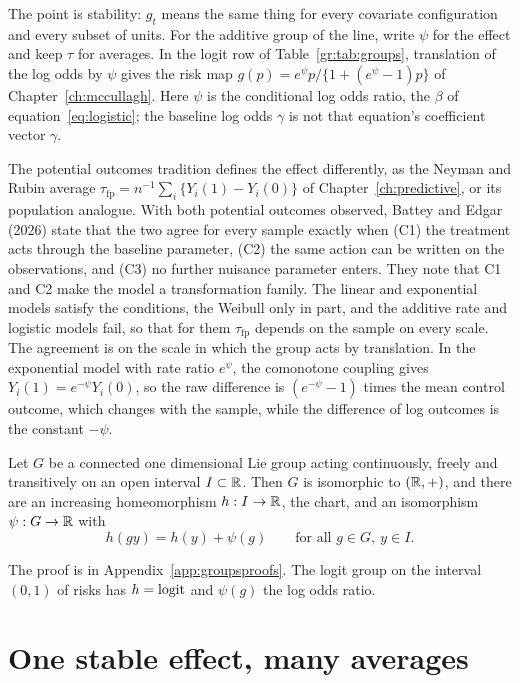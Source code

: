 The point is stability: $g_t$ means the same thing for every covariate configuration and every subset of units. For the additive group of the line, write $\psi$ for the effect and keep $\tau$ for averages. In the logit row of Table~\ref{gr:tab:groups}, translation of the log odds by $\psi$ gives the risk map $g(p)=e^{\psi}p/\{1+(e^{\psi}-1)p\}$ of Chapter~\ref{ch:mccullagh}. Here $\psi$ is the conditional log odds ratio, the $\beta$ of equation~\eqref{eq:logistic}; the baseline log odds $\gamma$ is not that equation's coefficient vector $\gamma$.

The potential outcomes tradition defines the effect differently, as the Neyman and Rubin average $\tau_{\mathrm{fp}}=n^{-1}\sum_i\{Y_i(1)-Y_i(0)\}$ of Chapter~\ref{ch:predictive}, or its population analogue. With both potential outcomes observed, Battey and Edgar (2026) state that the two agree for every sample exactly when (C1) the treatment acts through the baseline parameter, (C2) the same action can be written on the observations, and (C3) no further nuisance parameter enters. They note that C1 and C2 make the model a transformation family. The linear and exponential models satisfy the conditions, the Weibull only in part, and the additive rate and logistic models fail, so that for them $\tau_{\mathrm{fp}}$ depends on the sample on every scale. The agreement is on the scale in which the group acts by translation. In the exponential model with rate ratio $e^{\psi}$, the comonotone coupling gives $Y_i(1)=e^{-\psi}Y_i(0)$, so the raw difference is $(e^{-\psi}-1)$ times the mean control outcome, which changes with the sample, while the difference of log outcomes is the constant $-\psi$.



\begin{lemma}\label{gr:lem:chart}
Let $G$ be a connected one dimensional Lie group acting continuously, freely and transitively on an open interval $I\subset\mathbb{R}$. Then $G$ is isomorphic to $(\mathbb{R},+)$, and there are an increasing homeomorphism $h:I\to\mathbb{R}$, the chart, and an isomorphism $\psi:G\to\mathbb{R}$ with
\[
h(gy)=h(y)+\psi(g)\qquad\text{for all } g\in G,\ y\in I.
\]
\end{lemma}

The proof is in Appendix~\ref{app:groupsproofs}. The logit group on the interval $(0,1)$ of risks has $h=\operatorname{logit}$ and $\psi(g)$ the log odds ratio.

\section{One stable effect, many averages}\label{gr:sec:many}


